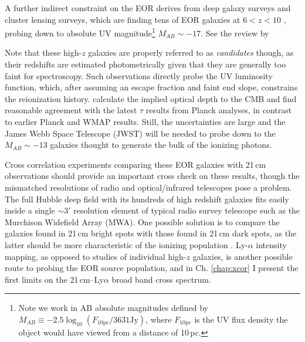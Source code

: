 A further indirect constraint on the EOR derives from deep galaxy surveys and cluster lensing surveys, which are finding tens of EOR galaxies at $6<z<10$ \citep{Bouwens2011,Illingworth2013,Dunlop2013}, probing down to absolute UV magnitude\footnote{Note we work in AB absolute magnitudes defined by $M_{AB}\equiv-2.5\log_{10}(F_{10\text{pc}}/3631\text{Jy})$, where $F_{10\text{pc}}$ is the UV flux density the object would have viewed from a distance of 10\,pc.} $M_{AB}\sim-17$.  See the review by \citet{madau14review}{ Note that these high-$z$ galaxies are properly referred to as \textit{candidates} though, as their redshifts are estimated photometrically given that they are generally too faint for spectroscopy. Such observations directly probe the UV luminosity function, which, after assuming an escape fraction and faint end slope, constrains the reionization history. \citet{RobertsonReionization2015} calculate the implied optical depth to the CMB and find reasonable agreement with the latest $\tau$ results from Planck analyses, in contrast to earlier Planck \citep{Robertson2013} and WMAP \citep{hinshaw_et_al_2012} results. Still, the uncertainties are large and the James Webb Space Telescope (JWST) will be needed to probe down to the $M_{AB}\sim-13$ galaxies thought to generate the bulk of the ionizing photons.

Cross correlation experiments comparing these EOR galaxies with 21\,cm observations should provide an important cross check on these results, though the mismatched resolutions of radio and optical/infrared telescopes pose a problem. The full Hubble deep field with its hundreds of high redshift galaxies fits easily inside a single $\sim3'$ resolution element of typical radio survey telescope such as the Murchison Widefield Array (MWA). One possible solution is to compare the galaxies found in 21\,cm bright spots with those found in 21\,cm dark spots, as the latter should be more characteristic of the ionizing population \citep{beardsley15}. Ly-$\alpha$ intensity mapping, as opposed to studies of individual high-$z$ galaxies, is another possible route to probing the EOR source population, and in Ch. \ref{chap:xcor} I present the first limits on the 21\,cm--Ly$\alpha$ broad band cross spectrum.

}
